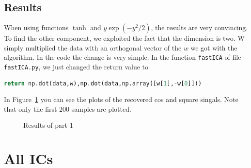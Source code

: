 \documentclass[10pt,a4paper]{article}
\begin{document}
\subsection{Results}
When using functions $\tanh$ and $y\exp(-y^2/2)$, the results are very convincing. To find the other component, we exploited the fact that the dimension is two. W simply multiplied the data with an orthogonal vector of the $w$ we got with the algorithm.
In the code the change is very simple. In the function \texttt{fastICA} of file \texttt{fastICA.py}, we just changed the return value to
\begin{lstlisting}[language=python]
return np.dot(data,w),np.dot(data,np.array([w[1],-w[0]]))
\end{lstlisting}
In Figure~\ref{fig:results1} you can see the plots of the recovered cos and square singals. Note that only the first 200 samples are plotted. 
\begin{figure}
    \centering
    \caption{Results of part 1}
    \label{fig:results1}
\end{figure}

\section{All ICs}
\end{document}
